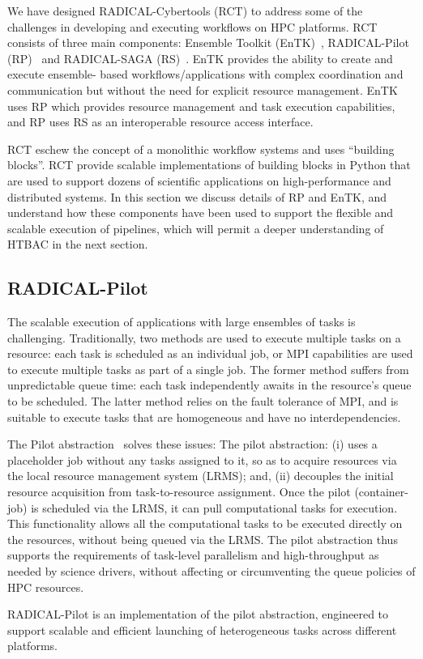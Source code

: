 
We have designed RADICAL-Cybertools (RCT) to address some of the challenges
in developing and executing workflows on HPC platforms. RCT consists of three
main components: Ensemble Toolkit (EnTK)~\cite{balasubramanian2016ensemble},
RADICAL-Pilot (RP)~\cite{merzky2015radical} and RADICAL-SAGA
(RS)~\cite{saga-x}. EnTK provides the ability to create and execute ensemble-
based workflows/applications with complex coordination and communication but
without the need for explicit resource management. EnTK uses RP which
provides resource management and task execution capabilities, and RP uses RS
as an interoperable resource access  interface.

RCT eschew the concept of a monolithic workflow systems and uses ``building
blocks''. RCT provide scalable implementations of building blocks in Python
that are used to support dozens of scientific applications on
high-performance and distributed systems. In this section we discuss details
of RP and EnTK, and understand how these components have been used to support
the flexible and scalable execution of pipelines, which will permit a deeper
understanding of HTBAC in the next section.



\subsection{RADICAL-Pilot}

The scalable execution of applications with large ensembles of tasks is
challenging. Traditionally, two methods are used to execute multiple tasks on
a resource: each task is scheduled as an individual job, or MPI capabilities
are used to execute multiple tasks as part of a single job. The former method
suffers from unpredictable queue time: each task independently awaits in the
resource's queue to be scheduled. The latter method relies on the fault
tolerance of MPI, and is suitable to execute tasks that are homogeneous and
have no interdependencies.

The Pilot abstraction~\cite{turilli2017comprehensive} solves these issues:
The pilot abstraction: (i) uses a placeholder job without any tasks assigned
to it, so as to acquire resources via the local resource management system
(LRMS); and, (ii) decouples the initial resource acquisition from
task-to-resource assignment. Once the pilot (container-job) is scheduled via
the LRMS, it can pull computational tasks for execution. This functionality
allows all the computational tasks to be executed directly on the resources,
without being queued via the LRMS\@. %
The pilot abstraction thus supports the requirements of task-level
parallelism and high-throughput as needed by science drivers, without
affecting or circumventing the queue policies of HPC resources.

RADICAL-Pilot is an implementation of the pilot abstraction, engineered to
support scalable and efficient launching of heterogeneous tasks across
different platforms.